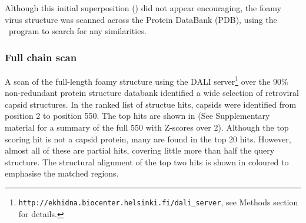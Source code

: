 Although this initial superposition () did not appear encouraging, the foamy virus structure
was scanned across the Protein DataBank (PDB), using the \DALI\ program \cite{HolmLet93} to search for any similarities.

\subsubsection{Full chain scan}

A scan of the full-length foamy structure using the DALI server\footnote{
{\tt http://ekhidna.biocenter.helsinki.fi/dali\_server},
see Methods section for details.
}
over the 90\% non-redundant protein structure databank
identified a wide selection of retroviral capsid structures.  In the ranked list of structue hits,
capsids were identified from position 2 to position 550.
The top hits are shown in  (See Supplementary material for a summary of
the full 550 with Z-scores over 2).    Although the top scoring hit is not a capsid
protein, many are found in the top 20 hits.   However, almost all of these are partial
hits, covering little more than half the query structure.   The structural alignment of the top two hits
is shown in  coloured to emphasise the matched regions.

